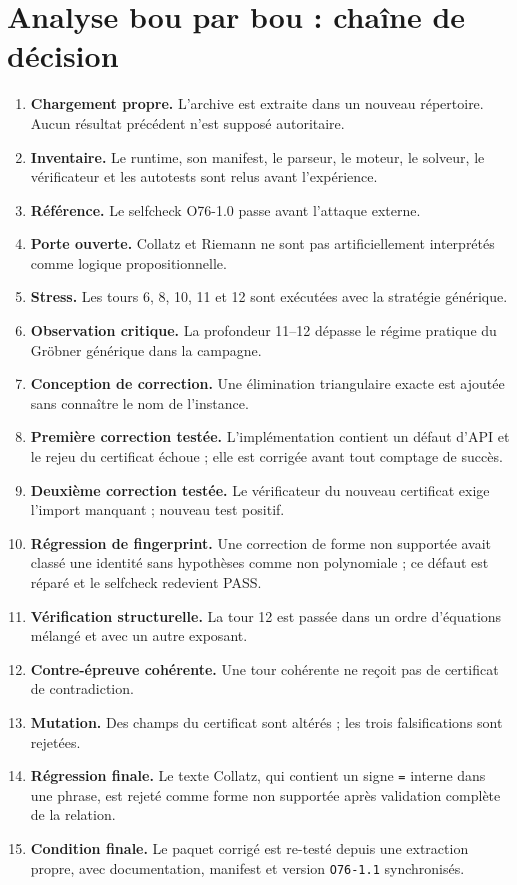 \documentclass[11pt,a4paper]{article}
\begin{document}
\section{Analyse bou par bou : chaîne de décision}
\begin{enumerate}
\item \textbf{Chargement propre.} L'archive est extraite dans un nouveau répertoire. Aucun résultat précédent n'est supposé autoritaire.
\item \textbf{Inventaire.} Le runtime, son manifest, le parseur, le moteur, le solveur, le vérificateur et les autotests sont relus avant l'expérience.
\item \textbf{Référence.} Le selfcheck O76-1.0 passe avant l'attaque externe.
\item \textbf{Porte ouverte.} Collatz et Riemann ne sont pas artificiellement interprétés comme logique propositionnelle.
\item \textbf{Stress.} Les tours 6, 8, 10, 11 et 12 sont exécutées avec la stratégie générique.
\item \textbf{Observation critique.} La profondeur 11--12 dépasse le régime pratique du Gröbner générique dans la campagne.
\item \textbf{Conception de correction.} Une élimination triangulaire exacte est ajoutée sans connaître le nom de l'instance.
\item \textbf{Première correction testée.} L'implémentation contient un défaut d'API et le rejeu du certificat échoue ; elle est corrigée avant tout comptage de succès.
\item \textbf{Deuxième correction testée.} Le vérificateur du nouveau certificat exige l'import manquant ; nouveau test positif.
\item \textbf{Régression de fingerprint.} Une correction de forme non supportée avait classé une identité sans hypothèses comme non polynomiale ; ce défaut est réparé et le selfcheck redevient PASS.
\item \textbf{Vérification structurelle.} La tour 12 est passée dans un ordre d'équations mélangé et avec un autre exposant.
\item \textbf{Contre-épreuve cohérente.} Une tour cohérente ne reçoit pas de certificat de contradiction.
\item \textbf{Mutation.} Des champs du certificat sont altérés ; les trois falsifications sont rejetées.
\item \textbf{Régression finale.} Le texte Collatz, qui contient un signe \texttt{=} interne dans une phrase, est rejeté comme forme non supportée après validation complète de la relation.
\item \textbf{Condition finale.} Le paquet corrigé est re-testé depuis une extraction propre, avec documentation, manifest et version \texttt{O76-1.1} synchronisés.
\end{enumerate}
\end{document}
